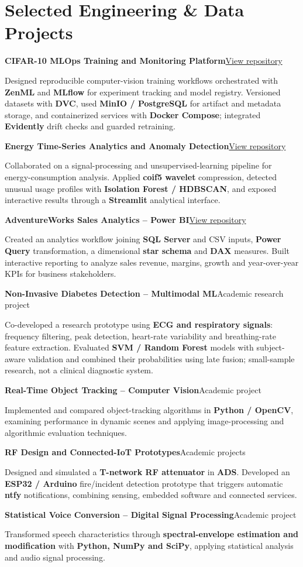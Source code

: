 \documentclass[10pt,a4paper]{article}
\newcommand{\project}[3]{%
  \needspace{5\baselineskip}%
  {\bfseries\color{navy}#1}\hfill{\fontsize{8.3}{10}\selectfont\color{gray}#2}\par
  #3\par\vspace{5pt}
}
\begin{document}
\section{Selected Engineering \& Data Projects}
\project{CIFAR-10 MLOps Training and Monitoring Platform}{\href{https://github.com/WaelMelkiMelki/The-OpenMLOps-Challenge-Sup-erSonic}{View repository}}{Designed reproducible computer-vision training workflows orchestrated with \textbf{ZenML} and \textbf{MLflow} for experiment tracking and model registry. Versioned datasets with \textbf{DVC}, used \textbf{MinIO / PostgreSQL} for artifact and metadata storage, and containerized services with \textbf{Docker Compose}; integrated \textbf{Evidently} drift checks and guarded retraining.}
\project{Energy Time-Series Analytics and Anomaly Detection}{\href{https://github.com/WaelMelkiMelki/Pipeline-d-Analyse-pour-Donn-es-de-Consommation-d-nergie-Ondelettes-Isolation-Forest-et-HDBSCAN}{View repository}}{Collaborated on a signal-processing and unsupervised-learning pipeline for energy-consumption analysis. Applied \textbf{coif5 wavelet} compression, detected unusual usage profiles with \textbf{Isolation Forest / HDBSCAN}, and exposed interactive results through a \textbf{Streamlit} analytical interface.}
\project{AdventureWorks Sales Analytics -- Power BI}{\href{https://github.com/WaelMelkiMelki/End-to-End-Sales-Analytics-Dashboard-AdventureWorks-Power-BI-}{View repository}}{Created an analytics workflow joining \textbf{SQL Server} and CSV inputs, \textbf{Power Query} transformation, a dimensional \textbf{star schema} and \textbf{DAX} measures. Built interactive reporting to analyze sales revenue, margins, growth and year-over-year KPIs for business stakeholders.}
\project{Non-Invasive Diabetes Detection -- Multimodal ML}{Academic research project}{Co-developed a research prototype using \textbf{ECG and respiratory signals}: frequency filtering, peak detection, heart-rate variability and breathing-rate feature extraction. Evaluated \textbf{SVM / Random Forest} models with subject-aware validation and combined their probabilities using late fusion; small-sample research, not a clinical diagnostic system.}
\project{Real-Time Object Tracking -- Computer Vision}{Academic project}{Implemented and compared object-tracking algorithms in \textbf{Python / OpenCV}, examining performance in dynamic scenes and applying image-processing and algorithmic evaluation techniques.}
\project{RF Design and Connected-IoT Prototypes}{Academic projects}{Designed and simulated a \textbf{T-network RF attenuator} in \textbf{ADS}. Developed an \textbf{ESP32 / Arduino} fire/incident detection prototype that triggers automatic \textbf{ntfy} notifications, combining sensing, embedded software and connected services.}
\project{Statistical Voice Conversion -- Digital Signal Processing}{Academic project}{Transformed speech characteristics through \textbf{spectral-envelope estimation and modification} with \textbf{Python, NumPy and SciPy}, applying statistical analysis and audio signal processing.}
\end{document}
